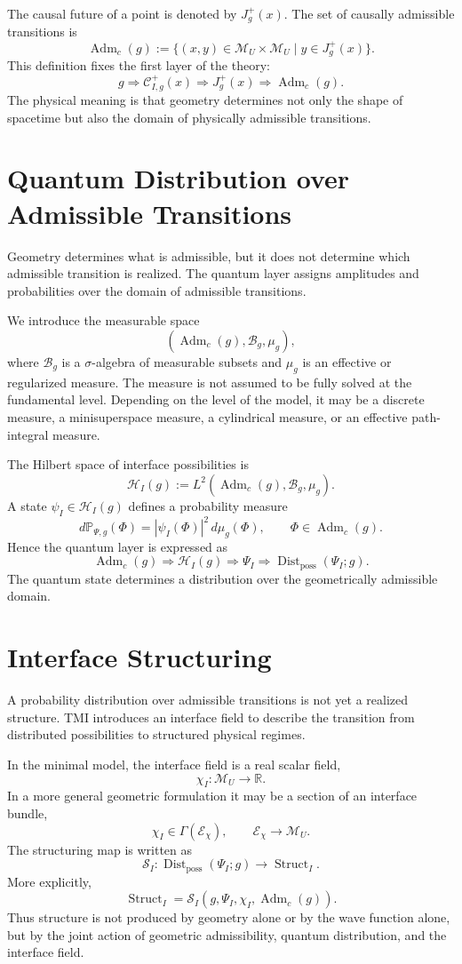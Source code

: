 \documentclass[12pt,a4paper]{article}
\DeclareMathOperator{\Adm}{Adm}
\DeclareMathOperator{\Struct}{Struct}
\DeclareMathOperator{\Dist}{Dist}
\newcommand{\M}{\mathcal M_U}
\newcommand{\Hilb}{\mathcal H}
\newcommand{\Prob}{\mathbb P}
\begin{document}
The causal future of a point is denoted by $J_g^+(x)$. The set of causally admissible transitions is
\[
\boxed{
\Adm_c(g):=
\{(x,y)\in\M\times\M\mid y\in J_g^+(x)\}.
}
\]
This definition fixes the first layer of the theory:
\[
\boxed{g\Rightarrow \mathcal C^+_{I,g}(x)\Rightarrow J_g^+(x)\Rightarrow \Adm_c(g).}
\]
The physical meaning is that geometry determines not only the shape of spacetime but also the domain of physically admissible transitions.

\section{Quantum Distribution over Admissible Transitions}
Geometry determines what is admissible, but it does not determine which admissible transition is realized. The quantum layer assigns amplitudes and probabilities over the domain of admissible transitions.

We introduce the measurable space
\[
(\Adm_c(g),\mathcal B_g,\mu_g),
\]
where $\mathcal B_g$ is a $\sigma$-algebra of measurable subsets and $\mu_g$ is an effective or regularized measure. The measure is not assumed to be fully solved at the fundamental level. Depending on the level of the model, it may be a discrete measure, a minisuperspace measure, a cylindrical measure, or an effective path-integral measure.

The Hilbert space of interface possibilities is
\[
\boxed{
\Hilb_I(g):=L^2(\Adm_c(g),\mathcal B_g,\mu_g).
}
\]
A state $\psi_I\in\Hilb_I(g)$ defines a probability measure
\[
\boxed{
d\Prob_{\Psi,g}(\Phi)=|\psi_I(\Phi)|^2\,d\mu_g(\Phi),
\qquad \Phi\in\Adm_c(g).
}
\]
Hence the quantum layer is expressed as
\[
\boxed{
\Adm_c(g)\Rightarrow \Hilb_I(g)\Rightarrow \Psi_I\Rightarrow \Dist_{\mathrm{poss}}(\Psi_I;g).
}
\]
The quantum state determines a distribution over the geometrically admissible domain.

\section{Interface Structuring}
A probability distribution over admissible transitions is not yet a realized structure. TMI introduces an interface field to describe the transition from distributed possibilities to structured physical regimes.

In the minimal model, the interface field is a real scalar field,
\[
\boxed{\chi_I:\M\to\mathbb R.}
\]
In a more general geometric formulation it may be a section of an interface bundle,
\[
\boxed{\chi_I\in\Gamma(\mathcal E_\chi),\qquad \mathcal E_\chi\to\M.}
\]
The structuring map is written as
\[
\boxed{
\mathcal S_I:\Dist_{\mathrm{poss}}(\Psi_I;g)\longrightarrow \Struct_I.
}
\]
More explicitly,
\[
\boxed{
\Struct_I=\mathcal S_I(g,\Psi_I,\chi_I,\Adm_c(g)).
}
\]
Thus structure is not produced by geometry alone or by the wave function alone, but by the joint action of geometric admissibility, quantum distribution, and the interface field.
\end{document}
